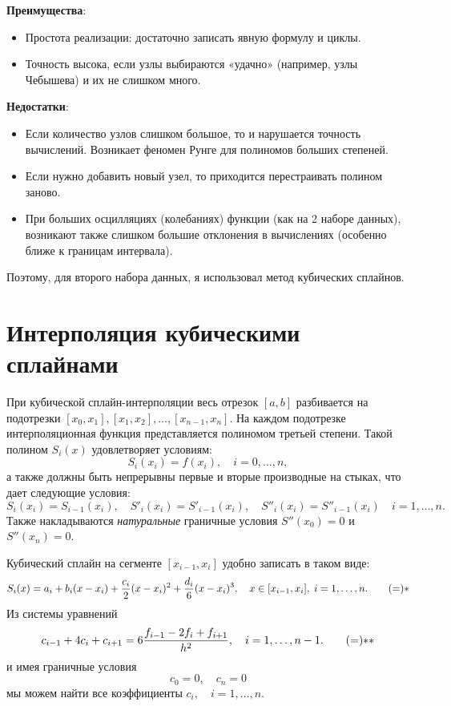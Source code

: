 \documentclass[a4paper, fleqn]{report}
\begin{document}
\vspace{10pt}

\textbf{Преимущества}:
\begin{itemize}
    \item Простота реализации: достаточно записать явную формулу и циклы.
    \item Точность высока, если узлы выбираются «удачно» (например, узлы Чебышева) и их не слишком много.
\end{itemize}

\textbf{Недостатки}:
\begin{itemize}
    \item Если количество узлов слишком большое, то и нарушается точность вычислений. Возникает феномен Рунге для полиномов больших степеней.
    \item Если нужно добавить новый узел, то приходится перестраивать полином заново.
    \item При больших осцилляциях (колебаниях) функции (как на 2 наборе данных), возникают также слишком большие отклонения в вычислениях (особенно ближе к границам интервала). 
\end{itemize}



Поэтому, для второго набора данных, я использовал метод кубических сплайнов.

\section{Интерполяция кубическими сплайнами}


При кубической сплайн-интерполяции весь отрезок \([a, b]\) разбивается на подотрезки \linebreak \([x_0, x_1], [x_1, x_2], \ldots, [x_{n-1}, x_n]\). На каждом подотрезке интерполяционная функция представляется полиномом третьей степени. Такой полином \( S_i(x) \) удовлетворяет условиям:
\[
S_i(x_i) = f(x_i), \quad i = 0, \dots, n,
\]
а также должны быть непрерывны первые и вторые производные на стыках, что дает следующие условия:
\[
S_i(x_i) = S_{i-1}(x_i), \quad S'_i(x_i) = S'_{i-1}(x_i), \quad S''_i(x_i) = S''_{i-1}(x_i) \quad i = 1, \dots, n.
\]
Также накладываются \textit{натуральные} граничные условия \( S''(x_0) = 0 \) и \( S''(x_n) = 0 \).

\vspace{10pt}

\noindent Кубический сплайн на сегменте \([x_{i-1}, x_i]\) удобно записать в таком виде:
\[
S_i(x) = a_i + b_i(x - x_i) + \frac{c_i}{2}(x - x_i)^2 + \frac{d_i}{6}(x - x_i)^3, \quad x \in [x_{i-1}, x_i], \; i = 1, \ldots, n. \tag ={*}
\]
Из системы уравнений 
\[
c_{i-1} + 4c_i + c_{i+1} = 6 \frac{f_{i-1} - 2f_i +f_{i+1}}{h^2}, \quad i = 1, \dots, n-1. \tag ={**}
\]
и имея граничные условия
\[
c_0 = 0, \quad c_n = 0
\]
мы можем найти все коэффициенты \(c_i, \quad i = 1, \dots, n\).
\end{document}
